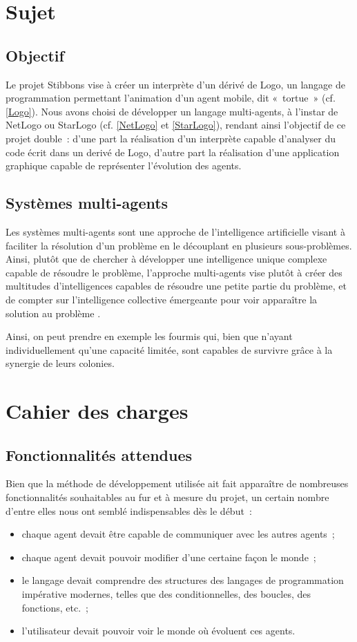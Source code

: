 \section{Sujet}
	\subsection{Objectif}
	Le projet Stibbons vise à créer un interprète d'un dérivé de Logo, un langage de programmation permettant l'animation d'un agent mobile, dit «~tortue~» (cf. \ref{Logo}). Nous avons choisi de développer un langage multi-agents, à l'instar de NetLogo ou StarLogo (cf. \ref{NetLogo} et \ref{StarLogo}), rendant ainsi l'objectif de ce projet double~: d'une part la réalisation d'un interprète capable d'analyser du code écrit dans un derivé de Logo, d'autre part la réalisation d'une application graphique capable de représenter l'évolution des agents.

	\subsection{Systèmes multi-agents}
	Les systèmes multi-agents sont une approche de l'intelligence artificielle visant à faciliter la résolution d'un problème en le découplant en plusieurs sous-problèmes. Ainsi, plutôt que de chercher à développer une intelligence unique complexe capable de résoudre le problème, l'approche multi-agents vise plutôt à créer des multitudes d'intelligences capables de résoudre une petite partie du problème, et de compter sur l'intelligence collective émergeante pour voir apparaître la solution au problème \cite{sma}.

	Ainsi, on peut prendre en exemple les fourmis qui, bien que n'ayant individuellement qu'une capacité limitée, sont capables de survivre grâce à la synergie de leurs colonies.

\section{Cahier des charges}
	\subsection{Fonctionnalités attendues}
	Bien que la méthode de développement utilisée ait fait apparaître de nombreuses fonctionnalités souhaitables au fur et à mesure du projet, un certain nombre d'entre elles nous ont semblé indispensables dès le début~:
	\begin{itemize}
		\item chaque agent devait être capable de communiquer avec les autres agents~;
		\item chaque agent devait pouvoir modifier d'une certaine façon le monde~;
		\item le langage devait comprendre des structures des langages de programmation impérative modernes, telles que des conditionnelles, des boucles, des fonctions, etc.~;
		\item l'utilisateur devait pouvoir voir le monde où évoluent ces agents.
	\end{itemize}

